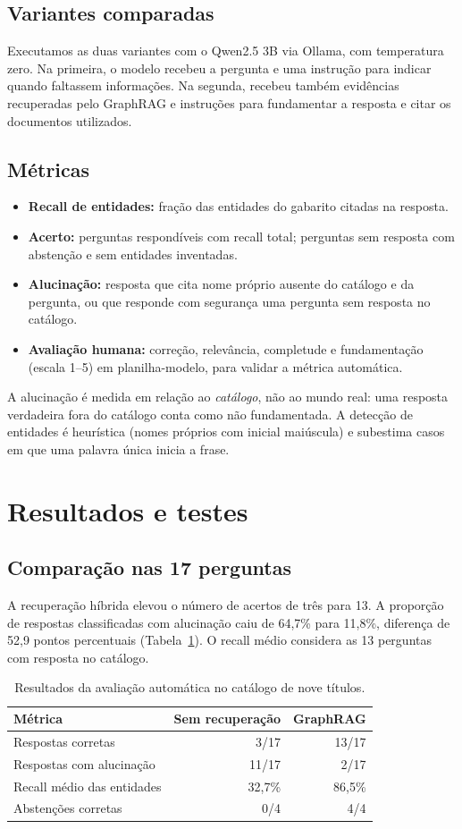\documentclass[12pt]{article}
\begin{document}
\subsection{Variantes comparadas}
Executamos as duas variantes com o Qwen2.5 3B via Ollama, com temperatura zero. Na primeira, o modelo recebeu a pergunta e uma instrução para indicar quando faltassem informações. Na segunda, recebeu também evidências recuperadas pelo GraphRAG e instruções para fundamentar a resposta e citar os documentos utilizados.

\subsection{Métricas}
\begin{itemize}
  \item \textbf{Recall de entidades:} fração das entidades do gabarito citadas na resposta.
  \item \textbf{Acerto:} perguntas respondíveis com recall total; perguntas sem resposta com abstenção
        e sem entidades inventadas.
  \item \textbf{Alucinação:} resposta que cita nome próprio ausente do catálogo e da pergunta, ou que
        responde com segurança uma pergunta sem resposta no catálogo.
  \item \textbf{Avaliação humana:} correção, relevância, completude e fundamentação (escala 1--5)
        em planilha-modelo, para validar a métrica automática.
\end{itemize}
A alucinação é medida em relação ao \emph{catálogo}, não ao mundo real: uma resposta verdadeira fora
do catálogo conta como não fundamentada. A detecção de entidades é heurística (nomes próprios com
inicial maiúscula) e subestima casos em que uma palavra única inicia a frase.

\section{Resultados e testes}
\subsection{Comparação nas 17 perguntas}
A recuperação híbrida elevou o número de acertos de três para 13. A proporção de respostas classificadas com alucinação caiu de 64,7\% para 11,8\%, diferença de 52,9 pontos percentuais (Tabela~\ref{tab:geral}). O recall médio considera as 13 perguntas com resposta no catálogo.

\begin{table}[htbp]\centering
\caption{Resultados da avaliação automática no catálogo de nove títulos.}
\label{tab:geral}
\begin{tabular}{lrr}\toprule
Métrica & Sem recuperação & GraphRAG \\ \midrule
Respostas corretas & 3/17 & 13/17 \\
Respostas com alucinação & 11/17 & 2/17 \\
Recall médio das entidades & 32,7\% & 86,5\% \\
Abstenções corretas & 0/4 & 4/4 \\ \bottomrule
\end{tabular}\end{table}
\end{document}
